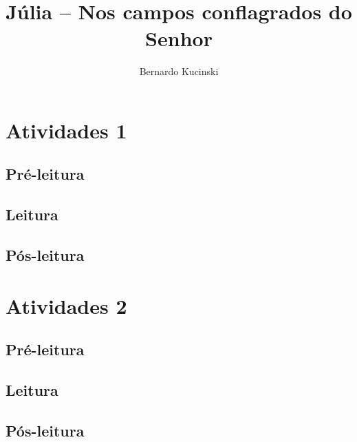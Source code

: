 \documentclass{extrarticle}
\begin{document}
\newcommand{\AutorLivro}{Bernardo Kucinski}
\newcommand{\TituloLivro}{Júlia – Nos campos conflagrados do Senhor}
\newcommand{\Tema}{Ficção, mistério e fantasia}
\newcommand{\Genero}{Romance}
\newcommand{\issnppub}{---}
\newcommand{\issnepub}{---}
\newcommand{\colaborador}{\textbf{Fulano de Tal} é uma pessoa incrível e vai fazer um bom serviço.}


\title{\TituloLivro}
\author{\AutorLivro}
\def\authornotes{\colaborador}

\date{}
\maketitle
\tableofcontents




\section{Atividades 1}


\subsection{Pré-leitura}
\subsection{Leitura}
\subsection{Pós-leitura}



\section{Atividades 2}

\subsection{Pré-leitura}
\subsection{Leitura}
\subsection{Pós-leitura}

\lipsum
\end{document}
